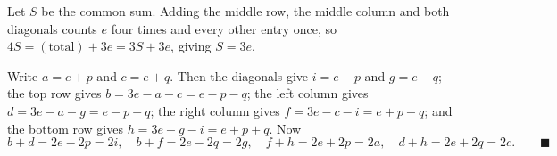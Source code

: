 Let $S$ be the common sum. Adding the middle row, the middle column and both diagonals counts $e$ four times and every other entry once, so $4S=(\text{total})+3e=3S+3e$, giving $S=3e$.

Write $a=e+p$ and $c=e+q$. Then the diagonals give $i=e-p$ and $g=e-q$; the top row gives $b=3e-a-c=e-p-q$; the left column gives $d=3e-a-g=e-p+q$; the right column gives $f=3e-c-i=e+p-q$; and the bottom row gives $h=3e-g-i=e+p+q$. Now
\[
b+d=2e-2p=2i,\quad b+f=2e-2q=2g,\quad f+h=2e+2p=2a,\quad d+h=2e+2q=2c. \qquad\blacksquare
\]
